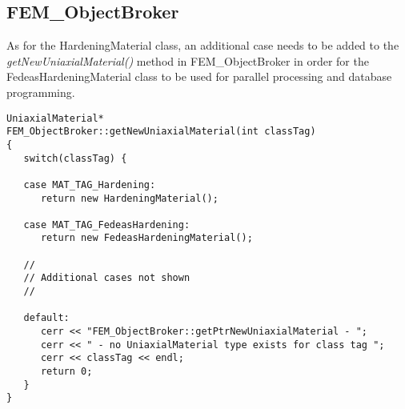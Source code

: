\documentclass[12pt]{article}
\begin{document}
\subsection{FEM\_ObjectBroker}
As for the HardeningMaterial class, an additional case needs to be added to the
{\em getNewUniaxialMaterial()} method in FEM\_ObjectBroker in order for the
FedeasHardeningMaterial class to be used for parallel processing and database
programming.

{\sf\small
\begin{verbatim}
UniaxialMaterial*
FEM_ObjectBroker::getNewUniaxialMaterial(int classTag)
{
   switch(classTag) {

   case MAT_TAG_Hardening:
      return new HardeningMaterial();

   case MAT_TAG_FedeasHardening:
      return new FedeasHardeningMaterial();

   //
   // Additional cases not shown
   //

   default:
      cerr << "FEM_ObjectBroker::getPtrNewUniaxialMaterial - ";
      cerr << " - no UniaxialMaterial type exists for class tag ";
      cerr << classTag << endl;
      return 0;
   }        
}
\end{verbatim}
}
\end{document}
